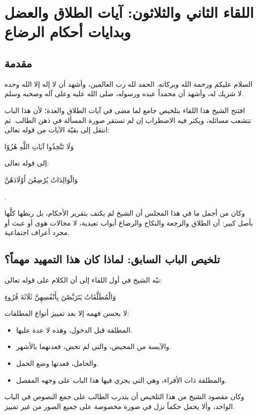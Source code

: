 \chapter{اللقاء الثاني والثلاثون: آيات الطلاق والعضل وبدايات أحكام الرضاع}

\section{مقدمة}
السلام عليكم ورحمة الله وبركاته. الحمد لله رب العالمين، وأشهد أن لا إله إلا الله وحده لا شريك له، وأشهد أن محمداً عبده ورسوله، صلى الله عليه وعلى آله وصحبه وسلم.

افتتح الشيخ هذا اللقاء بتلخيص جامع لما مضى في آيات الطلاق والعدة؛ لأن هذا الباب تتشعب مسائله، ويكثر فيه الاضطراب إن لم تستقر صورة المسألة في ذهن الطالب. ثم انتقل إلى بقيّة الآيات من قوله تعالى: \begin{ayah}وَلَا تَتَّخِذُوا آيَاتِ اللَّهِ هُزُوًا\end{ayah} إلى قوله تعالى: \begin{ayah}وَالْوَالِدَاتُ يُرْضِعْنَ أَوْلَادَهُنَّ\end{ayah}.

وكان من أجمل ما في هذا المجلس أن الشيخ لم يكتف بتقرير الأحكام، بل ربطها كلَّها بأصل كبير: أن الطلاق والرجعة والنكاح والرضاع أبواب تعبدية، لا مجالات هوى أو عبث أو مجرد أعراف اجتماعية.

\separator

\section{تلخيص الباب السابق: لماذا كان هذا التمهيد مهماً؟}
نبّه الشيخ في أول اللقاء إلى أن الكلام على قوله تعالى: \begin{ayah}وَالْمُطَلَّقَاتُ يَتَرَبَّصْنَ بِأَنْفُسِهِنَّ ثَلَاثَةَ قُرُوءٍ\end{ayah} لا يحسن فهمه إلا بعد تمييز أنواع المطلقات:
\begin{itemize}
    \item المطلقة قبل الدخول، وهذه لا عدة عليها.
    \item والآيسة من المحيض، والتي لم تحض، فعدتهما بالأشهر.
    \item والحامل، فعدتها وضع الحمل.
    \item والمطلقة ذات الأقراء، وهي التي يجري فيها هذا الباب على وجهه المفصل.
\end{itemize}

وكان مقصود الشيخ من هذا التلخيص أن يتدرب الطالب على جمع النصوص في الباب الواحد، وألا يحمل حكماً نزل في صورة مخصوصة على جميع الصور من غير تمييز.

